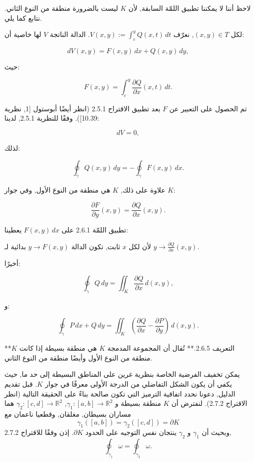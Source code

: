 لاحظ أننا لا يمكننا تطبيق اللمّة السابقة, لأن \( K \) ليست بالضرورة منطقة من النوع الثاني. نتابع كما يلي.

لكل \( (x, y) \in T \), نعرّف \( V(x, y) := \int_c^y Q(x, t) \, dt \). الدالة الناتجة \( V \) لها خاصية أن:

\[ dV(x, y) = F(x, y) \, dx + Q(x, y) \, dy, \]

حيث:

\[ F(x, y) = \int_c^y \frac{\partial Q}{\partial x} (x, t) \, dt. \]

تم الحصول على التعبير عن \( F \) بعد تطبيق الاقتراح 2.5.1 (انظر أيضًا أبوستول [1, نظرية 10.39]). وفقًا للنظرية 2.5.1, لدينا:

\[ dV = 0, \]

لذلك:

\[ \oint_{\gamma} Q(x, y) \, dy = -\oint_{\gamma} F(x, y) \, dx. \]

علاوة على ذلك, \( K \) هي منطقة من النوع الأول, وفي جوار \( K \):

\[ \frac{\partial F}{\partial y} (x, y) = \frac{\partial Q}{\partial x} (x, y). \]

تطبيق اللمّة 2.6.1 على \( F(x, y) \, dx \) يعطينا:

لأن لكل \( x \) ثابت, تكون الدالة \( y \to F(x, y) \) بدائية لـ \( y \to \frac{\partial Q}{\partial x} (x, y). \)

أخيرًا:

\[ \oint_{\gamma} Q \, dy = \iint_K \frac{\partial Q}{\partial x} \, d(x, y), \]

و:

\[ \oint_{\gamma} P \, dx + Q \, dy = \iint_K \left( \frac{\partial Q}{\partial x} - \frac{\partial P}{\partial y} \right) \, d(x, y). \]


**التعريف 2.6.5.** تُقال أن المجموعة المدمجة \( K \) هي منطقة بسيطة إذا كانت \( K \) منطقة من النوع الأول وأيضًا منطقة من النوع الثاني.

يمكن تخفيف الفرضية الخاصة بنظرية غرين على المناطق البسيطة إلى حد ما, حيث يكفي أن يكون الشكل التفاضلي من الدرجة الأولى معرفًا في جوار \( K \). قبل تقديم الدليل, دعونا نحدد اتفاقية الترميز التي تكون صالحة بناءً على الحقيقة التالية (انظر الاقتراح 2.7.2). لنفترض أن \( K \) منطقة بسيطة و \( \gamma_1 : [a, b] \to \mathbb{R}^2 \), \( \gamma_2 : [c, d] \to \mathbb{R}^2 \) هما مساران بسيطان, مغلقان, وقطعيا ناعمان مع
\[ \gamma_1([a, b]) = \gamma_2([c, d]) = \partial K \]
وبحيث أن \( \gamma_1 \) و \( \gamma_2 \) ينتجان نفس التوجيه على الحدود \( \partial K \). إذن وفقًا للاقتراح 2.7.2,
\[ \oint_{\gamma_1} \omega = \oint_{\gamma_2} \omega. \]

